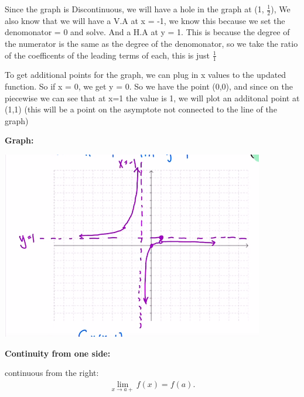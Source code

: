 \documentclass{report}
\begin{document}
        \bigbreak \noindent \bigbreak \noindent 
        Since the graph is Discontinuous, we will have a hole in the graph at (1, $ \frac{1}{2}$), 
        We also know that we will have a V.A at x = -1, we know this because we set the denomonator = 0 and solve.
        And a H.A at y = 1. This is because the degree of the numerator is the same as the degree of the denomonator, 
        so we take the ratio of the coefficents of the leading terms of each, this is just $ \frac{1}{1}$

        \bigbreak \noindent 
        To get additional points for the graph, we can plug in x values to the updated function. So if x = 0, we get 
        y = 0. So we have the point (0,0), and since on the piecewise we can see that at x=1 the value is 1,
        we will plot an additonal point at (1,1) (this will be a point on the asymptote not connected to the line of the graph)

        \pagebreak
        \begin{large}
            \noindent \textbf{Graph:}
        \end{large}

        \bigbreak \noindent 
        \begin{center}
            \includegraphics[scale=0.8]{../images/5.png}
        \end{center}

        \pagebreak
        \begin{large}
            \noindent \textbf{Continuity from one side:}
        \end{large}

        \bigbreak \noindent \bigbreak \noindent 
        continuous from the right:
        \begin{align*}
            \lim\limits_{x \to a+}{f \left(x\right) = f \left(a\right)}
        .\end{align*}
\end{document}
